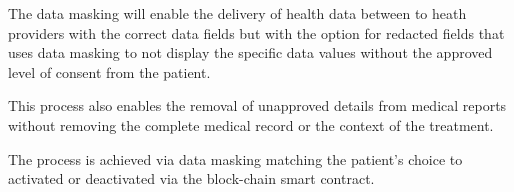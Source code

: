 
The data masking will enable the delivery of health data between to heath providers with the correct data fields but with the option for redacted fields that uses data masking to not display the specific data values without the approved level of consent from the patient.

This process also enables the removal of unapproved details from medical reports without removing the complete medical record or the context of the treatment.

The process is achieved via data masking matching the patient's choice to activated or deactivated via the block-chain smart contract.
